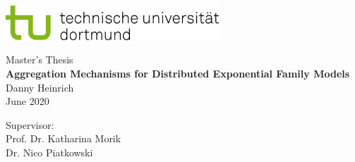 \begin{titlepage}
\vspace*{-2cm}
\newlength{\links}
\setlength{\links}{-1.5cm}
\sffamily
\hspace*{\links}
\begin{minipage}{12.5cm}
\includegraphics[width=8cm]{bilder/tud_logo_rgb}
\end{minipage}

\vspace*{4cm}

\hspace*{\links}
\hspace*{-0.2cm}
\begin{minipage}{9cm}
\large
\begin{center}
{\Large Master's Thesis} \\
\vspace*{1cm}
\textbf{Aggregation Mechanisms for Distributed Exponential Family Models} \\
\vspace*{1cm}
Danny Heinrich\\
June 2020
\end{center}
\end{minipage}
\normalsize
\vspace*{5.5cm}


\vspace*{2.1cm}

\hspace*{\links}
\begin{minipage}[b]{5cm}
\raggedright
Supervisor: \\
Prof. Dr. Katharina Morik \\
Dr. Nico Piatkowski \\
\end{minipage}


\end{titlepage}
